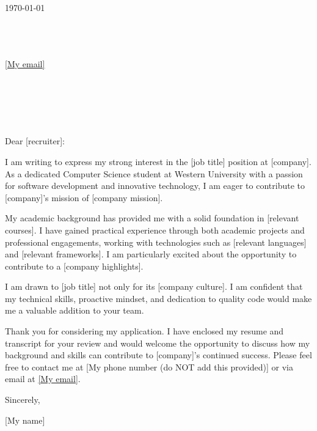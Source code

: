 \documentclass[11pt]{article}
\begin{document}
\begin{flushright}
\today
\end{flushright}

\noindent [My name]\\
[My location (do NOT add this line if not provided)] \\
[My phone (do NOT add this line if not provided)] \\
\href{mailto:[My email]}{[My email]} \\

\vspace{1em}

\noindent [company] \\
[recruiter position (do not add this line if none are provided)] \\
[recruiter (if none provided, put Hiring Manager)] \\
[company location (do not add this line if none are provided)] \\

\vspace{1em}

\noindent Dear [recruiter]:

\setlength{\parindent}{15pt}
\setlength{\parskip}{0.75em}

I am writing to express my strong interest in the [job title] position at [company]. As a dedicated Computer Science student at Western University with a passion for software development and innovative technology, I am eager to contribute to [company]’s mission of [company mission].

My academic background has provided me with a solid foundation in [relevant courses]. I have gained practical experience through both academic projects and professional engagements, working with technologies such as [relevant languages] and [relevant frameworks]. I am particularly excited about the opportunity to contribute to a [company highlights].

I am drawn to [job title] not only for its [company culture]. I am confident that my technical skills, proactive mindset, and dedication to quality code would make me a valuable addition to your team.

Thank you for considering my application. I have enclosed my resume and transcript for your review and would welcome the opportunity to discuss how my background and skills can contribute to [company]’s continued success. Please feel free to contact me at [My phone number (do NOT add this provided)] or via email at \href{[My email]}{[My email]}.

\setlength{\parindent}{0pt}

\vspace{1em}
Sincerely,

\vspace{1em}
[My name]
\end{document}
